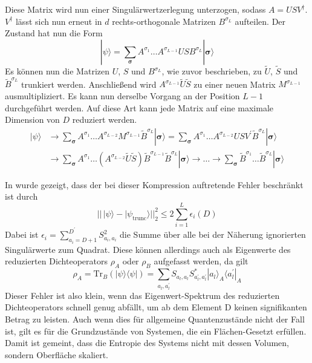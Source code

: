 \documentclass[10pt,a4paper]{report}
\begin{document}
Diese Matrix wird nun einer Singulärwertzerlegung unterzogen, sodass $A=USV^\dagger$. $V^\dagger$ lässt sich nun erneut in $d$ rechts-orthogonale Matrizen $B^{\sigma_L}$ aufteilen. Der Zustand hat nun die Form
\begin{equation}
|\psi\rangle=\sum_{\bm{\sigma}}A^{\sigma_1}\ldots A^{\sigma_{L-1}}USB^{\sigma_L}|\bm{\sigma}\rangle
\end{equation}
Es können nun die Matrizen $U$, $S$ und $B^{\sigma_L}$, wie zuvor beschrieben, zu $\tilde{U}$, $\tilde{S}$ und $\tilde{B}^{\sigma_L}$ trunkiert werden. Anschließend wird $A^{\sigma_{L-1}}\tilde{U}\tilde{S}$ zu einer neuen Matrix $M^{\sigma_{L-1}}$ ausmultipliziert. Es kann nun derselbe Vorgang an der Position $L-1$ durchgeführt werden. Auf diese Art kann jede  Matrix auf eine maximale Dimension von $D$ reduziert werden.
\begin{equation}\label{compression_equ}
\begin{split}
|\psi\rangle&\rightarrow \sum_{\bm{\sigma}}A^{\sigma_1}\ldots A^{\sigma_{L-2}}M^{\sigma_{L-1}}\tilde{B}^{\sigma_L}|\bm{\sigma}\rangle = \sum_{\bm{\sigma}}A^{\sigma_1}\ldots A^{\sigma_{L-2}}USV^{\prime}\tilde{B}^{\sigma_L}|\bm{\sigma}\rangle\\
&\rightarrow \sum_{\bm{\sigma}}A^{\sigma_1}\ldots (A^{\sigma_{L-2}}\tilde{U}\tilde{S})\tilde{B}^{\sigma_{L-1}}\tilde{B}^{\sigma_L}|\bm{\sigma}\rangle\rightarrow \ldots\rightarrow\sum_{\bm{\sigma}}\tilde{B}^{\sigma_1}\ldots \tilde{B}^{\sigma_{L}}|\bm{\sigma}\rangle
\end{split}
\end{equation}

In \cite{MPS_error} wurde gezeigt, dass der bei dieser Kompression auftretende Fehler beschränkt ist durch
\begin{equation}
||\,|\psi\rangle-|\psi_{\text{trunc}}\rangle||_2^2\leq 2\sum_{i=1}^{L}\epsilon_i(D)
\end{equation}
Dabei ist $\epsilon_i=\sum_{a_i=D+1}^{D^{\prime}}S_{a_i,a_i}^2$ die Summe über alle bei der Näherung ignorierten Singulärwerte zum Quadrat. Diese können allerdings auch als Eigenwerte des reduzierten Dichteoperators $\rho_A$ oder $\rho_B$ aufgefasst werden, da gilt
\begin{equation}
\rho_A=\text{Tr}_B(|\psi\rangle\langle\psi|)=\sum_{a_l,a_l^{\prime}}S_{a_l,a_l}S_{a_l^{\prime},a_l^{\prime}}^{\ast}|a_l\rangle_A\langle a_l^{\prime}|_A
\end{equation}
Dieser Fehler ist also klein, wenn das Eigenwert-Spektrum des reduzierten Dichteoperators schnell genug abfällt, um ab dem Element D keinen signifikanten Betrag zu leisten. Auch wenn dies für allgemeine Quantenzustände nicht der Fall ist, gilt es für die Grundzustände von Systemen, die ein Flächen-Gesetzt erfüllen. Damit ist gemeint, dass die Entropie des Systems nicht mit dessen Volumen, sondern Oberfläche skaliert.\cite{Area_law}\\
\end{document}
